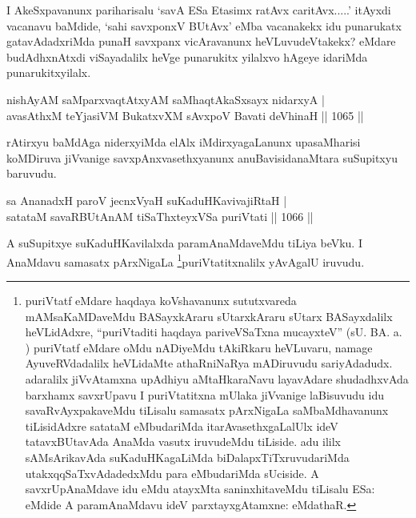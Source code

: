 \begin{artha}
 I AkeSxpavanunx pariharisalu `savA ESa Etasimx ratAvx caritAvx.....' itAyxdi vacanavu baMdide, `sahi savxponxV BUtAvx' eMba vacanakekx idu punarukatx gatavAdadxriMda punaH savxpanx vicAravanunx heVLuvudeVtakekx? eMdare budAdhxnAtxdi viSayadalilx heVge punarukitx yilalxvo hAgeye idariMda punarukitxyilalx.
\end{artha}


\begin{shl}
nishAyAM saMparxvaqtAtxyAM saMhaqtAkaSxsayx nidarxyA | \\
avasAthxM teYjasiVM BukatxvXM sAvxpoV Bavati deVhinaH \hfill||  1065 ||  
\end{shl}

\begin{artha}
rAtirxyu baMdAga niderxyiMda elAlx iMdirxyagaLanunx upasaMharisi koMDiruva jiVvanige savxpAnxvasethxyanunx anuBavisidanaMtara suSupitxyu baruvudu.
\end{artha}

\begin{shl}
sa AnanadxH paroV jecnxVyaH suKaduHKavivajiRtaH | \\
satataM savaRBUtAnAM tiSaThxteyxVSa puriVtati \hfill||  1066 ||  
\end{shl}

\begin{artha}
A suSupitxye suKaduHKavilalxda paramAnaMdaveMdu tiLiya beVku. I AnaMdavu samasatx pArxNigaLa \footnote{puriVtatf eMdare haqdaya koVshavanunx sututxvareda mAMsaKaMDaveMdu BASayxkAraru sUtarxkAraru sUtarx BASayxdalilx heVLidAdxre, ``puriVtaditi haqdaya pariveVSaTxna mucayxteV'' (sU. BA. a. ) puriVtatf eMdare oMdu nADiyeMdu tAkiRkaru heVLuvaru, namage AyuveRVdadalilx heVLidaMte athaRniNaRya mADiruvudu sariyAdadudx. adaralilx jiVvAtamxna upAdhiyu aMtaHkaraNavu layavAdare shudadhxvAda barxhamx savxrUpavu I puriVtatitxna mUlaka jiVvanige laBisuvudu idu savaRvAyxpakaveMdu tiLisalu samasatx pArxNigaLa saMbaMdhavanunx tiLisidAdxre satataM eMbudariMda itarAvasethxgaLalUlx ideV tatavxBUtavAda AnaMda vasutx iruvudeMdu tiLiside. adu ililx sAMsArikavAda suKaduHKagaLiMda biDalapxTiTxruvudariMda utakxqqSaTxvAdadedxMdu para eMbudariMda sUciside. A savxrUpAnaMdave idu eMdu atayxMta saninxhitaveMdu tiLisalu ESa: eMdide A paramAnaMdavu ideV parxtayxgAtamxne: eMdathaR.}puriVtatitxnalilx yAvAgalU iruvudu.
\end{artha}

